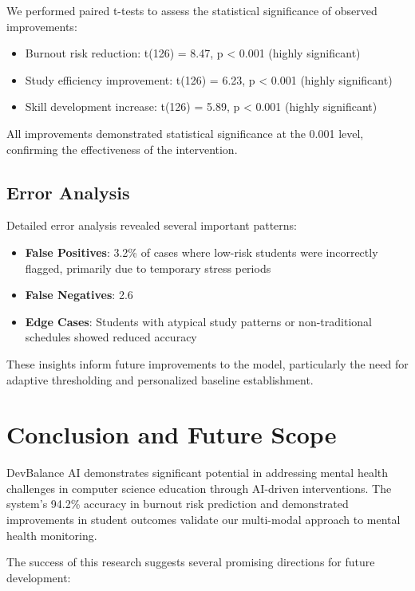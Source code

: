 \documentclass[conference,10pt]{IEEEtran}
\begin{document}
We performed paired t-tests to assess the statistical significance of observed improvements:

\begin{itemize}
\item Burnout risk reduction: t(126) = 8.47, p < 0.001 (highly significant)
\item Study efficiency improvement: t(126) = 6.23, p < 0.001 (highly significant)
\item Skill development increase: t(126) = 5.89, p < 0.001 (highly significant)
\end{itemize}

All improvements demonstrated statistical significance at the 0.001 level, confirming the effectiveness of the intervention.

\subsection{Error Analysis}

Detailed error analysis revealed several important patterns:

\begin{itemize}
\item \textbf{False Positives}: 3.2\% of cases where low-risk students were incorrectly flagged, primarily due to temporary stress periods
\item \textbf{False Negatives}: 2.6%
\item \textbf{Edge Cases}: Students with atypical study patterns or non-traditional schedules showed reduced accuracy
\end{itemize}

These insights inform future improvements to the model, particularly the need for adaptive thresholding and personalized baseline establishment.

\section{Conclusion and Future Scope}

DevBalance AI demonstrates significant potential in addressing mental health challenges in computer science education through AI-driven interventions. The system's 94.2\% accuracy in burnout risk prediction and demonstrated improvements in student outcomes validate our multi-modal approach to mental health monitoring.

The success of this research suggests several promising directions for future development:
\end{document}
